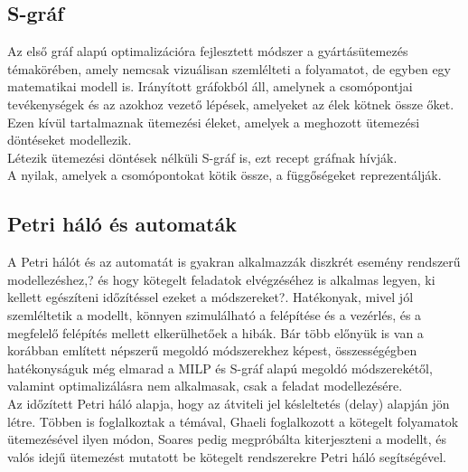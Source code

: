 \documentclass {report}
\begin{document}
 \subsection{S-gráf}
   Az első gráf alapú optimalizációra fejlesztett módszer a gyártásütemezés témakörében, amely nemcsak vizuálisan szemlélteti a folyamatot, de egyben egy matematikai modell is. Irányított gráfokból áll, amelynek a csomópontjai tevékenységek és az azokhoz vezető lépések, amelyeket az élek kötnek össze őket. Ezen kívül tartalmaznak ütemezési éleket, amelyek a meghozott ütemezési döntéseket modellezik.\\
   Létezik ütemezési döntések nélküli S-gráf is, ezt recept gráfnak hívják. \\
   A nyilak,  amelyek a csomópontokat kötik össze, a függőségeket reprezentálják.\cite{Smidla2010} \cite{Hegyhati2009}

\subsection{Petri háló és automaták}
A Petri hálót és az automatát is gyakran alkalmazzák diszkrét esemény rendszerű modellezéshez,? és hogy kötegelt feladatok elvégzéséhez is alkalmas legyen, ki kellett egészíteni  időzítéssel ezeket a módszereket?. Hatékonyak, mivel jól szemléltetik a modellt, könnyen szimulálható a felépítése és a vezérlés, és a megfelelő felépítés mellett elkerülhetőek a hibák. Bár több előnyük is van a korábban említett népszerű megoldó módszerekhez képest, összességégben hatékonyságuk még elmarad a MILP és S-gráf alapú megoldó módszerekétől, valamint optimalizálásra nem alkalmasak, csak a feladat modellezésére. \\
Az időzített Petri háló alapja, hogy az átviteli jel késleltetés (delay) alapján jön létre. Többen is foglalkoztak a témával, Ghaeli foglalkozott a kötegelt folyamatok ütemezésével ilyen módon, Soares pedig megpróbálta kiterjeszteni a modellt, és valós idejű ütemezést mutatott be kötegelt rendszerekre Petri háló segítségével. 
\end{document}
